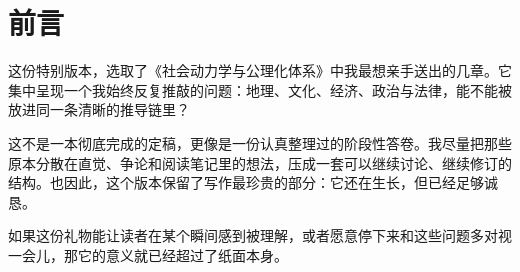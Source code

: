 \chapter*{前言}

这份特别版本，选取了《社会动力学与公理化体系》中我最想亲手送出的几章。它集中呈现一个我始终反复推敲的问题：地理、文化、经济、政治与法律，能不能被放进同一条清晰的推导链里？

这不是一本彻底完成的定稿，更像是一份认真整理过的阶段性答卷。我尽量把那些原本分散在直觉、争论和阅读笔记里的想法，压成一套可以继续讨论、继续修订的结构。也因此，这个版本保留了写作最珍贵的部分：它还在生长，但已经足够诚恳。

如果这份礼物能让读者在某个瞬间感到被理解，或者愿意停下来和这些问题多对视一会儿，那它的意义就已经超过了纸面本身。
